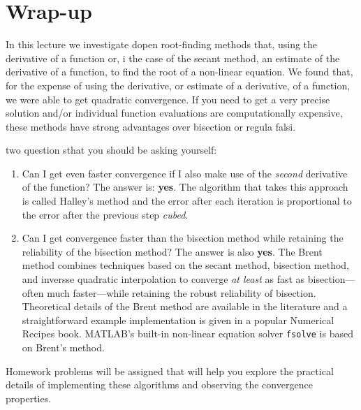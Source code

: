 \section{Wrap-up}
In this lecture we investigate dopen root-finding methods that, using the derivative of a function or, i the case of the secant method, an estimate of the derivative of a function, to find the root of a non-linear equation.  We found that, for the expense of using the derivative, or estimate of a derivative, of a function, we were able to get quadratic convergence.  If you need to get a very precise solution and/or individual function evaluations are computationally expensive, these methods have strong advantages over bisection or regula falsi.  

 two question sthat you should be asking yourself:
\begin{enumerate}
\item Can I get even faster convergence if I also make use of the \emph{second} derivative of the function?  The answer is: \textbf{yes}.  The algorithm that takes this approach is called Halley's method\cite{gander1985halley} and the error after each iteration is proportional to the error after the previous step \emph{cubed}.

\item Can I get convergence faster than the bisection method while retaining the reliability of the bisection method?  The answer is also \textbf{yes}.  The Brent method combines techniques based on the secant method, bisection method, and inversse quadratic interpolation to converge \emph{at least} as fast as bisection---often much faster---while retaining the robust reliability of bisection.  Theoretical details of the Brent method are available in the literature\cite{forsythe1977computer} and a straightforward example implementation is given in a popular Numerical Recipes\cite{press1988numerical} book.  MATLAB's built-in non-linear equation solver \lstinline[style=myMatlab]{fsolve} is based on Brent's method.

\end{enumerate}
Homework problems will be assigned that will help you explore the practical details of implementing these algorithms and observing the convergence properties.
